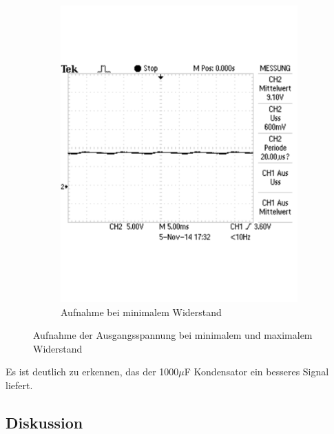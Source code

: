 \documentclass[12pt,a4paper]{article}
\begin{document}
\begin{figure}[H]
\begin{subfigure}[b]{0.48\textwidth}
                \includegraphics[width=\textwidth , scale = 0.4]{2_6_1000F_2.pdf}
                \caption[Aufnahme bei minimalem Widerstand]{Aufnahme bei minimalem Widerstand}
  				\label{fig:2_6_1000F_2}
        \end{subfigure}
        \caption{Aufnahme der Ausgangsspannung bei minimalem und maximalem Widerstand}
        \label{fig:2_6_1000F}
\end{figure}

Es ist deutlich zu erkennen, das der 1000$\mu$F Kondensator ein besseres Signal liefert.

\subsection{Diskussion}
\end{document}
